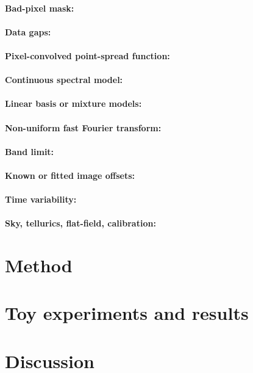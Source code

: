 \documentclass[11pt]{article}
\begin{document}
\paragraph{Bad-pixel mask:}

\paragraph{Data gaps:}

\paragraph{Pixel-convolved point-spread function:}

\paragraph{Continuous spectral model:}

\paragraph{Linear basis or mixture models:}

\paragraph{Non-uniform fast Fourier transform:}

\paragraph{Band limit:}

\paragraph{Known or fitted image offsets:}

\paragraph{Time variability:}

\paragraph{Sky, tellurics, flat-field, calibration:}

\section{Method}

\section{Toy experiments and results}

\section{Discussion}
\end{document}
